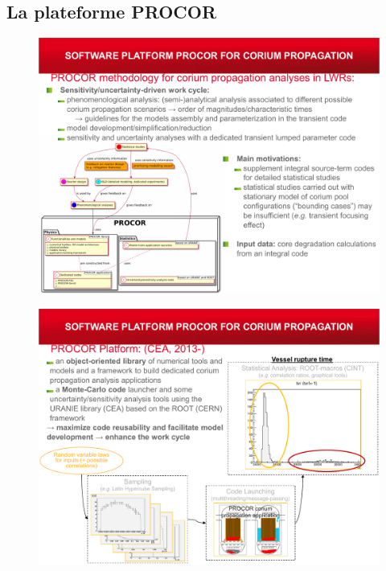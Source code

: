 \subsection{La plateforme PROCOR}
\begin{frame}[fragile]
	\baselineskip
	\begin{figure}[H]
	\centering \includegraphics[height=\textheight]{Figures/procor_0a.pdf} 
	\end{figure}
\end{frame}
\begin{frame}[fragile]
	\baselineskip
	\begin{figure}[H]
	\centering \includegraphics[height=\textheight]{Figures/procor_0b.pdf} 
	\end{figure}
\end{frame}
